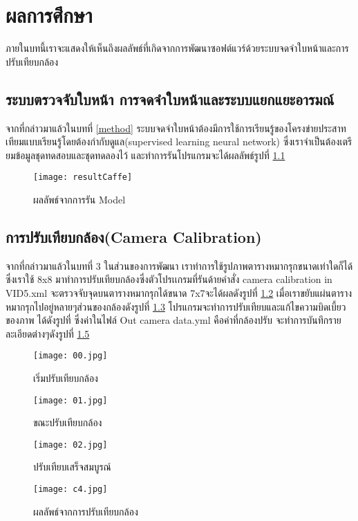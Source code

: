 \chapter{ผลการศึกษา}
ภายในบทนี้เราจะแสดงให้เห็นถึงผลลัพธ์ที่เกิดจากการพัฒนาซอฟต์แวร์ด้วยระบบจดจำใบหน้าและการปรับเทียบกล้อง
\section{ระบบตรวจจับใบหน้า การจดจำใบหน้าและระบบแยกแยะอารมณ์}
จากที่กล่าวมาแล้วในบทที่ \ref{method} ระบบจดจำใบหน้าต้องมีการใช้การเรียนรู้ของโครงข่ายประสาทเทียมแบบเรียนรู้โดยต้องกำกับดูแล(supervised learning neural network) ซึ่งเราจำเป็นต้องเตรียมข้อมูลชุดทดสอบและชุดทดลองไว้ และทำการรันโปรแกรมจะได้ผลลัพธ์รูปที่ \ref{fig:resultCaffe}
\begin{figure}[h!]
  \centerline{
    \texttt{[image: resultCaffe]}
  }
  \caption{ผลลัพธ์จากการรัน Model}
\label{fig:resultCaffe}
\hrulefill
\end{figure}

\section{การปรับเทียบกล้อง(Camera Calibration)}
จากที่กล่าวมาแล้วในบทที่ 3 ในส่วนของการพัฒนา เราทำการใช้รูปภาพตารางหมากรุกขนาดเท่าใดก็ได้ ซึ่งเราใช้ 8x8 มาทำการปรับเทียบกล้องซึ่งตัวโปรเเกรมที่รันด้ายคำสั่ง camera calibration in VID5.xml จะตรวจจับจุดบนตารางหมากรุกได้ขนาด 7x7จะได้ผลดังรูปที่ \ref{fig:00} เมื่อเราขยับแผ่นตารางหมากรุกไปอยู่หลายๆส่วนของกล้องดังรูปที่ \ref{fig:01} โปรแกรมจะทำการปรับเทียบและแก้ไขความบิดเบี้ยวของภาพ ได้ดังรูปที่ ซึ่งค่าในไฟล์ Out camera data.yml คือค่าที่กล้องปรับ จะทำการบันทึกรายละเอียดต่างๆดังรูปที่ \ref{fig:c4}
\begin{figure}[h!]
  \centerline{
    \texttt{[image: 00.jpg]}
  }
  \caption{เริ่มปรับเทียบกล้อง}
\label{fig:00}
\hrulefill
\end{figure}

\begin{figure}[h!]
  \centerline{
    \texttt{[image: 01.jpg]}
  }
  \caption{ขณะปรับเทียบกล้อง}
\label{fig:01}
\hrulefill
\end{figure}

\begin{figure}[h!]
  \centerline{
    \texttt{[image: 02.jpg]}
  }
  \caption{ปรับเทียบเสร็จสมบูรณ์}
\label{fig:02}
\hrulefill
\end{figure}

\begin{figure}[h!]
  \centerline{
    \texttt{[image: c4.jpg]}
  }
  \caption{ผลลัพธ์จากการปรับเทียบกล้อง}
\label{fig:c4}
\hrulefill
\end{figure}
